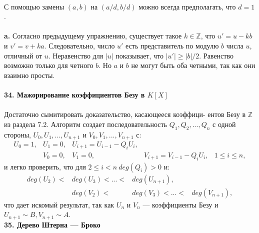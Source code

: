 \documentclass{mai_book}
\begin{document}
\\
\hspace*{15pt}С помощью замены $(a, b)$ на $(a/d, b/d)$  можно всегда предполагать,\linebreak
что $d = 1$.\\
\\
\hspace*{15pt}\textbf{a.} Согласно предыдущему упражнению, существует такое $k \in \mathbb{Z}$,\linebreak
что $u' = u - kb$ и $v' = v+ka$. Следовательно, число $u'$ есть представитель\linebreak
по модулю $b$ числа $u$, отличный от $u$. Неравенство для $|u|$ показывает,\linebreak
что $|u'| \geqslant |b|/2$. Равенство возможно только для четного $b$. Но $a$ и $b$ не\linebreak
могут быть оба четными, так как они взаимно просты.\\
\\
\noindent\textbf{34. Мажорирование коэффициентов Безу в $K[X]$}\\
\\
\hspace*{15pt}Достаточно сымитировать доказательство, касающееся коэффици-­\linebreak
ентов Безу в $\mathbb{Z}$ из раздела 7.2. Алгоритм создает последовательность\linebreak
$Q_1, Q_2, ..., Q_n$  с одной стороны, $U_0, U_1, ..., U_{n+1}$ и $V_0, V_1, ..., V_{n+1}$ с:
		$$\begin{array}{ccccc}
			U_0 = 1,& U_1 = 0, & U_{i+1} = U_{i-1} - Q_iU_i, &                               & \\
								& V_0 = 0, & V_1 = 0,                    & V_{i+1} = V_{i-1} - Q_iU_i, & 1 \leqslant i \leqslant n,
		\end{array}$$
и легко проверить, что для  $2 \leqslant i < n~ deg(Q_i) > 0$ и:
		$$\begin{array}{cccc}
			deg(U_2) <  & deg(U_3) < ... < & deg(U_{n+1}),     & \\
							      & deg(V_2) <       & deg(V_3) < ... <  & deg(V_{n+1}),
		\end{array}$$
\noindent
что дает искомый результат, так как $U_n$ и $V_n$ ---  коэффициенты Безу\linebreak
и $U_{n+1} \sim B, V_{n+1} \sim A$.\\

\pagebreak
\noindent\textbf{35. Дерево Штерна — Броко}\\
\end{document}
